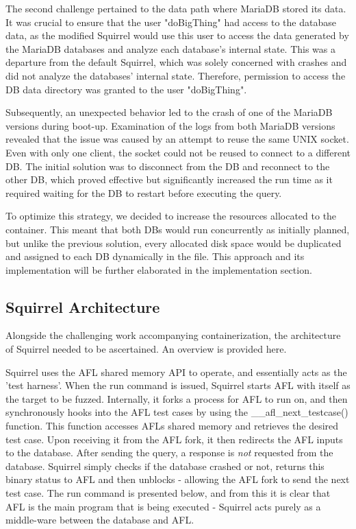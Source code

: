\documentclass[sigconf]{acmart}
\begin{document}
The second challenge pertained to the data path where MariaDB stored its data. It was crucial to ensure that the user "doBigThing" had access to the database data, as the modified Squirrel would use this user to access the data generated by the MariaDB databases and analyze each database's internal state. This was a departure from the default Squirrel, which was solely concerned with crashes and did not analyze the databases' internal state. Therefore, permission to access the DB data directory was granted to the user "doBigThing".

Subsequently, an unexpected behavior led to the crash of one of the MariaDB versions during boot-up. Examination of the logs from both MariaDB versions revealed that the issue was caused by an attempt to reuse the same UNIX socket. Even with only one client, the socket could not be reused to connect to a different DB. The initial solution was to disconnect from the DB and reconnect to the other DB, which proved effective but significantly increased the run time as it required waiting for the DB to restart before executing the query.

To optimize this strategy, we decided to increase the resources allocated to the container. This meant that both DBs would run concurrently as initially planned, but unlike the previous solution, every allocated disk space would be duplicated and assigned to each DB dynamically in the file. This approach and its implementation will be further elaborated in the implementation section. 

\subsection{Squirrel Architecture}
Alongside the challenging work accompanying containerization, the architecture of Squirrel needed to be ascertained. An overview is provided here.

Squirrel uses the AFL shared memory API to operate, and essentially acts as the 'test harness'. When the run command is issued, Squirrel starts AFL with itself as the target to be fuzzed. Internally, it forks a process for AFL to run on, and then synchronously hooks into the AFL test cases by using the \_\_afl\_next\_testcase() function. This function accesses AFLs shared memory and retrieves the desired test case. Upon receiving it from the AFL fork, it then redirects the AFL inputs to the database. After sending the query, a response is \textit{not} requested from the database. Squirrel simply checks if the database crashed or not, returns this binary status to AFL and then unblocks - allowing the AFL fork to send the next test case.  The run command is presented below, and from this it is clear that AFL is the main program that is being executed - Squirrel acts purely as a middle-ware between the database and AFL.
\end{document}
